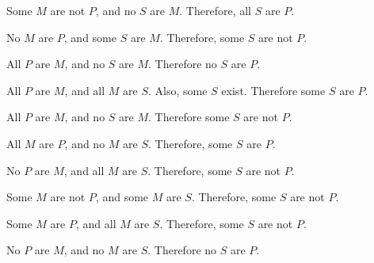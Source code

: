 \begin{exercises} 
 
\item Some $M$ are not $P$, and no $S$ are $M$. Therefore, all $S$ are $P$.
 
\item No $M$ are $P$, and some $S$ are $M$. Therefore, some $S$ are not $P$.
 
\item All $P$ are $M$, and no $S$ are $M$. Therefore no $S$ are $P$. 
 
\item All $P$ are $M$, and all $M$ are $S$. Also, some $S$ exist. Therefore some $S$ are $P$. 
  
\item All $P$ are $M$, and no $S$ are $M$. Therefore some $S$ are not $P$. 
 
\item All $M$ are $P$, and no $M$ are $S$. Therefore, some $S$ are $P$.
 
\item No $P$ are $M$, and all $M$ are $S$. Therefore, some $S$ are not $P$.
 
\item Some $M$ are not $P$, and some $M$ are $S$. Therefore, some $S$ are not $P$.
  
\item Some $M$ are $P$, and all $M$ are $S$. Therefore, some $S$ are not $P$.
 
\item No $P$ are $M$, and no $M$ are $S$. Therefore no $S$ are $P$.
 
\end{exercises}

%
%

